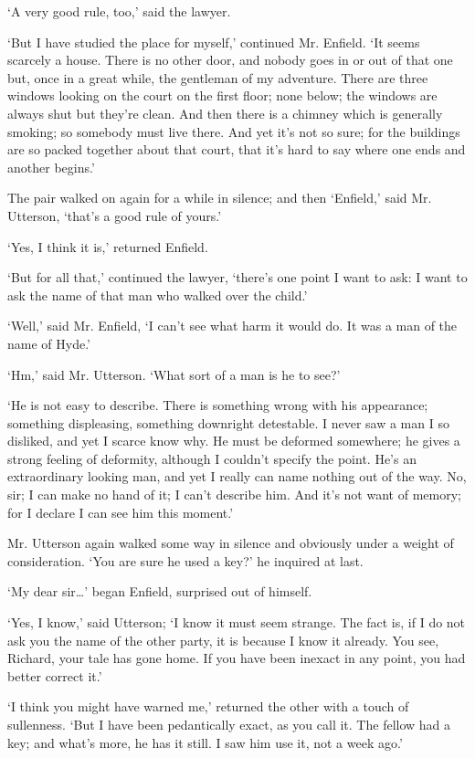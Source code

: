 \documentclass[]{novel}
\begin{document}
‘A very good rule, too,’ said the lawyer.

‘But I have studied the place for myself,’ continued Mr. Enfield. ‘It seems scarcely a house. There is no other door, and nobody goes in or out of that one but, once in a great while, the gentleman of my adventure. There are three windows looking on the court on the first floor; none below; the windows are always shut but they’re clean. And then there is a chimney which is generally smoking; so somebody must live there. And yet it’s not so sure; for the buildings are so packed together about that court, that it’s hard to say where one ends and another begins.’

The pair walked on again for a while in silence; and then ‘Enfield,’ said Mr. Utterson, ‘that’s a good rule of yours.’

‘Yes, I think it is,’ returned Enfield.

‘But for all that,’ continued the lawyer, ‘there’s one point I want to ask: I want to ask the name of that man who walked over the child.’

‘Well,’ said Mr. Enfield, ‘I can’t see what harm it would do. It was a man of the name of Hyde.’

‘Hm,’ said Mr. Utterson. ‘What sort of a man is he to see?’

‘He is not easy to describe. There is something wrong with his appearance; something displeasing, something downright detestable. I never saw a man I so disliked, and yet I scarce know why. He must be deformed somewhere; he gives a strong feeling of deformity, although I couldn’t specify the point. He’s an extraordinary looking man, and yet I really can name nothing out of the way. No, sir; I can make no hand of it; I can’t describe him. And it’s not want of memory; for I declare I can see him this moment.’

Mr. Utterson again walked some way in silence and obviously under a weight of consideration. ‘You are sure he used a key?’ he inquired at last.

‘My dear sir…’ began Enfield, surprised out of himself.

‘Yes, I know,’ said Utterson; ‘I know it must seem strange. The fact is, if I do not ask you the name of the other party, it is because I know it already. You see, Richard, your tale has gone home. If you have been inexact in any point, you had better correct it.’

‘I think you might have warned me,’ returned the other with a touch of sullenness. ‘But I have been pedantically exact, as you call it. The fellow had a key; and what’s more, he has it still. I saw him use it, not a week ago.’
\end{document}
